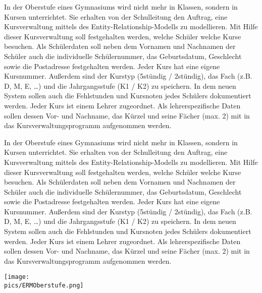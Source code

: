 \begin{Exercise}[title=Erstelle ein ERM., label=ERMErstellen3]
	In der Oberstufe eines Gymnasiums wird nicht mehr in Klassen, sondern in Kursen unterrichtet. Sie erhalten von der Schulleitung den Auftrag, eine Kursverwaltung mittels des Entity-Relationship-Modells zu modellieren. Mit Hilfe dieser Kursverwaltung soll festgehalten werden, welche Schüler welche Kurse besuchen. Als Schülerdaten soll neben dem Vornamen und Nachnamen der Schüler auch die individuelle Schülernummer, das Geburtsdatum, Geschlecht sowie die Postadresse festgehalten	werden. Jeder Kurs hat eine eigene Kursnummer. Außerdem sind der Kurstyp (5stündig / 2stündig), das Fach (z.B. D, M, E, …) und die Jahrgangsstufe (K1 / K2) zu speichern. In dem neuen System sollen auch die Fehlstunden und Kursnoten jedes Schülers dokumentiert werden. Jeder Kurs ist einem Lehrer zugeordnet. Als lehrerspezifische Daten sollen dessen Vor- und Nachname, das Kürzel und seine Fächer (max. 2) mit in das Kursverwaltungsprogramm aufgenommen werden.
\end{Exercise}
\begin{Answer}[ref=ERMErstellen3]
	In der Oberstufe eines Gymnasiums wird nicht mehr in Klassen, sondern in Kursen unterrichtet. Sie erhalten von der Schulleitung den Auftrag, eine Kursverwaltung mittels des Entity-Relationship-Modells zu modellieren. Mit Hilfe dieser Kursverwaltung soll festgehalten werden, welche Schüler welche Kurse besuchen. Als Schülerdaten soll neben dem Vornamen und Nachnamen der Schüler auch die individuelle Schülernummer, das Geburtsdatum, Geschlecht sowie die Postadresse festgehalten werden. Jeder Kurs hat eine eigene Kursnummer. Außerdem sind der Kurstyp (5stündig / 2stündig), das Fach (z.B. D, M, E, …) und die Jahrgangsstufe (K1 / K2) zu speichern. In dem neuen System sollen auch die Fehlstunden und Kursnoten jedes Schülers dokumentiert werden. Jeder Kurs ist einem Lehrer zugeordnet. Als lehrerspezifische Daten sollen dessen Vor- und Nachname, das Kürzel und seine Fächer (max. 2) mit in das Kursverwaltungsprogramm aufgenommen werden.
	\begin{minipage}{\textwidth}
		\centering\texttt{[image: \\pics/ERMOberstufe.png]}\\
	\end{minipage}
\end{Answer}
